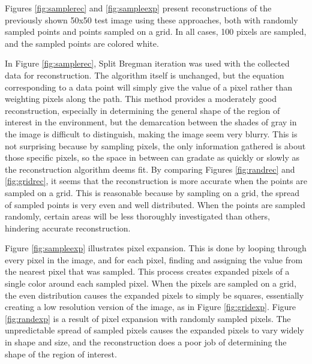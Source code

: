 \documentclass[english]{article}\usepackage[]{graphicx}\usepackage[]{color}
\begin{document}
Figures \ref{fig:samplerec} and \ref{fig:sampleexp} present reconstructions of the previously shown 50x50 test image using these approaches, both with randomly sampled points and points sampled on a grid. In all cases, 100 pixels are sampled, and the sampled points are colored white.

In Figure \ref{fig:samplerec}, Split Bregman iteration was used with the collected data for reconstruction. The algorithm itself is unchanged, but the equation corresponding to a data point will simply give the value of a pixel rather than weighting pixels along the path. This method provides a moderately good reconstruction, especially in determining the general shape of the region of interest in the environment, but the demarcation between the shades of gray in the image is difficult to distinguish, making the image seem very blurry. This is not surprising because by sampling pixels, the only information gathered is about those specific pixels, so the space in between can gradate as quickly or slowly as the reconstruction algorithm deems fit. By comparing Figures \ref{fig:randrec} and \ref{fig:gridrec}, it seems that the reconstruction is more accurate when the points are sampled on a grid. This is reasonable because by sampling on a grid, the spread of sampled points is very even and well distributed. When the points are sampled randomly, certain areas will be less thoroughly investigated than others, hindering accurate reconstruction.

Figure \ref{fig:sampleexp} illustrates pixel expansion. This is done by looping through every pixel in the image, and for each pixel, finding and assigning the value from the nearest pixel that was sampled. This process creates expanded pixels of a single color around each sampled pixel. When the pixels are sampled on a grid, the even distribution causes the expanded pixels to simply be squares, essentially creating a low resolution version of the image, as in Figure \ref{fig:gridexp}. Figure \ref{fig:randexp} is a result of pixel expansion with randomly sampled pixels. The unpredictable spread of sampled pixels causes the expanded pixels to vary widely in shape and size, and the reconstruction does a poor job of determining the shape of the region of interest.
\end{document}
